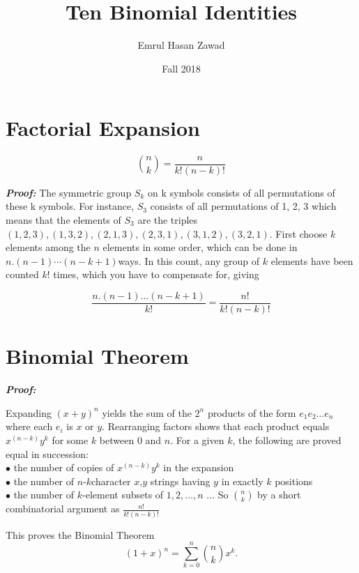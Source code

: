 \documentclass{article}
\begin{document}
\title{{\sc Ten Binomial Identities}}
\author{Emrul Hasan Zawad}
\date{Fall 2018}
\maketitle


\section{Factorial Expansion}

\[
    \binom{n}{k} = \frac{n}{k!(n-k)!}
\]

\textbf{\textit{Proof:}}
The symmetric group $S_k$ on k symbols consists of all permutations of these k symbols. For instance, $S_3$ consists of all permutations of 1, 2, 3 which means that the elements of $S_3$ are the triples $(1,2,3),(1,3,2),(2,1,3),(2,3,1),(3,1,2),(3,2,1)$.
\newline
\newline
First choose $k$ elements among the $n$ elements in some order, which can be done in $n.(n-1)\cdots(n-k+1)$ways.
\newline
\newline
In this count, any group of $k$ elements have been counted $k$! times, which you have to compensate for, giving

\[
    \frac{n.(n-1)\dots(n-k+1)}{k!} = \frac{n!}{k!(n-k)!}
\]


\section{Binomial Theorem}

\textbf{\textit{Proof:}}

Expanding ${(x+y)}^n$ yields the sum of the $2^n$ products of the form $e_1e_2 \ldots e_n$ where each $e_i$ is $x$ or $y$. Rearranging factors shows that each product equals $x^{(n-k)}y^k$ for some $k$ between $0$ and $n$. For a given $k$, the following are proved equal in succession: \\


$\bullet$ the number of copies of $x^{(n-k)}y^k$ in the expansion \\
$\bullet$ the number of $n$-$k$character $x$,$y$ strings having $y$ in exactly $k$ positions \\
$\bullet$ the number of $k$-element subsets of ${1,2,\ldots,n}$ $\dots$ So $\binom{n}{k}$ by a short combinatorial argument as $\frac{n!}{k!(n-k)!}$

This proves the Binomial Theorem
\[
    {(1+x)}^n = \sum_{k=0}^n\binom{n}{k}x^k.
\]
\end{document}
